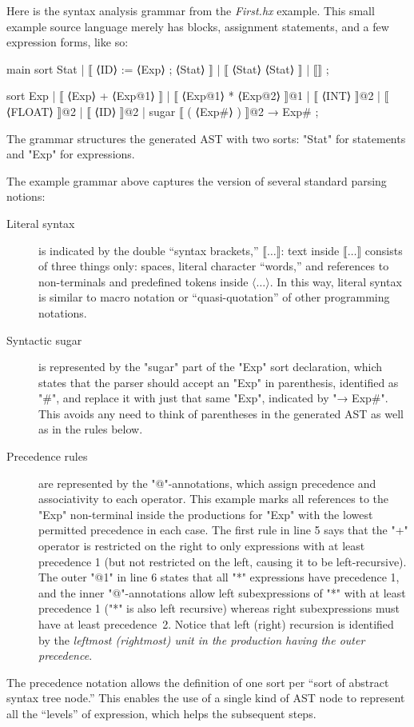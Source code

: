 \documentclass[12pt]{article} %
\begin{document}
\begin{example}\label{ex:syntax}
  Here is the syntax analysis grammar from the \emph{First.hx} example. This small example source
  language merely has blocks, assignment statements, and a few expression forms, like so:
  \begin{hacs}[xleftmargin=\parindent,xrightmargin=2em,numbers=right]
main sort Stat  | ⟦ ⟨ID⟩ := ⟨Exp⟩ ; ⟨Stat⟩ ⟧
                | ⟦ { ⟨Stat⟩ } ⟨Stat⟩ ⟧
                | ⟦⟧ ;

sort Exp  | ⟦ ⟨Exp⟩ + ⟨Exp@1⟩ ⟧
           | ⟦ ⟨Exp@1⟩ * ⟨Exp@2⟩ ⟧@1
           | ⟦ ⟨INT⟩ ⟧@2
           | ⟦ ⟨FLOAT⟩ ⟧@2
           | ⟦ ⟨ID⟩ ⟧@2
           | sugar ⟦ ( ⟨Exp#⟩ ) ⟧@2 → Exp# ;
  \end{hacs}
  The grammar structures the generated AST with two sorts: "Stat" for statements and "Exp" for
  expressions.
\end{example}

The example grammar above captures the \HAX version of several standard parsing notions:
\begin{description}

\item[Literal syntax] is indicated by the double ``syntax brackets,'' $⟦…⟧$: text inside $⟦…⟧$
  consists of three things only: spaces, literal character ``words,'' and references to
  non-terminals and predefined tokens inside $⟨…⟩$.  In this way, literal syntax is similar to macro
  notation or ``quasi-quotation'' of other programming notations.

\item[Syntactic sugar] is represented by the "sugar" part of the "Exp" sort declaration, which
  states that the parser should accept an "Exp" in parenthesis, identified as "#", and replace it
  with just that same "Exp", indicated by "→ Exp#".  This avoids any need to think of parentheses in
  the generated AST as well as in the rules below.

\item[Precedence rules] are represented by the "@"-annotations, which assign precedence and
  associativity to each operator. This example marks all references to the "Exp" non-terminal inside
  the productions for "Exp" with the lowest permitted precedence in each case. The first rule in
  line 5 says that the "+" operator is restricted on the right to only expressions with at least
  precedence 1 (but not restricted on the left, causing it to be left-recursive). The outer "@1" in
  line 6 states that all "*" expressions have precedence 1, and the inner "@"-annotations allow left
  subexpressions of "*" with at least precedence 1 ("*" is also left recursive) whereas right
  subexpressions must have at least precedence~2. Notice that left (right) recursion is identified
  by the \emph{leftmost (rightmost) unit in the production having the outer precedence}.

\end{description}
The precedence notation allows the definition of one sort per ``sort of abstract syntax tree node.''
This enables the use of a single kind of AST node to represent all the ``levels'' of expression,
which helps the subsequent steps.
\end{document}
